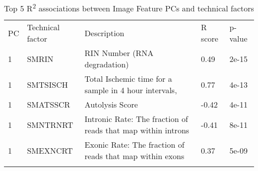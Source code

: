 \documentclass[graybox]{svmult}
\begin{document}
\begin{table}[H]
\caption{Top 5 R\textsuperscript{2} associations between Image Feature PCs and technical factors}
\label{tab:image_feature_pcs_and_tfs}       %

\begin{tabular}{p{1cm}p{2.4cm}p{11cm}p{1cm}p{1cm}}
\hline\noalign{\smallskip}
PC & Technical factor & Description & R score & p-value  \\
\noalign{\smallskip}\svhline\noalign{\smallskip}
1 & SMRIN & RIN Number (RNA degradation) & 0.49 & 2e-15\\
1 & SMTSISCH & Total Ischemic time for a sample in 4 hour intervals, & 0.77 & 4e-13\\
1 & SMATSSCR & Autolysis Score & -0.42 & 4e-11 \\
1 & SMNTRNRT & Intronic Rate: The fraction of reads that map within introns & -0.41 & 8e-11 \\
1 & SMEXNCRT & Exonic Rate: The fraction of reads that map within exons & 0.37 & 5e-09 \\
\noalign{\smallskip}\hline\noalign{\smallskip}
\end{tabular}
\end{table}




\end{document}
